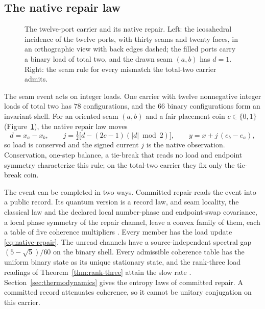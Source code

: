\documentclass[11pt]{article}
\theoremstyle{definition}
\theoremstyle{remark}
\begin{document}
\subsection{The native repair law}
\label{sec:native-repair}

\begin{figure}[!htb]
\centering

\caption{The twelve-port carrier and its native repair. Left: the icosahedral incidence of the twelve ports, with thirty seams and twenty faces, in an orthographic view with back edges dashed; the filled ports carry a binary load of total two, and the drawn seam $(a,b)$ has $d=1$. Right: the seam rule for every mismatch the total-two carrier admits.}
\label{fig:carrier}
\end{figure}

The seam event acts on integer loads. One carrier with twelve nonnegative
integer loads of total two has $78$ configurations, and the $66$ binary
configurations form an invariant shell. For an oriented seam $(a,b)$ and a
fair placement coin $c\in\{0,1\}$ (Figure~\ref{fig:carrier}), the native repair law moves
\begin{equation}
d=x_a-x_b,\qquad
j=\tfrac12\bigl[d-(2c-1)(|d|\bmod 2)\bigr],\qquad
y=x+j\,(e_b-e_a),
\label{eq:native-repair}
\end{equation}
so load is conserved and the signed current $j$ is the native observation.
Conservation, one-step balance, a tie-break that reads no load and endpoint
symmetry characterize this rule; on the total-two carrier they fix only the
tie-break coin.

The event can be completed in two ways. Committed repair reads the event
into a public record. Its quantum version is a record law, and seam
locality, the classical law and the declared local number-phase and
endpoint-swap covariance, a local phase symmetry of the repair channel, leave a convex
family of them, each a table of five coherence multipliers
\cite{ophrecordlaws}. Every member has the load update
\eqref{eq:native-repair}. The unread channels have a source-independent
spectral gap $(5-\sqrt5)/60$ on the binary shell. Every admissible coherence
table has the uniform binary state as its unique stationary state, and the
rank-three load readings of Theorem~\ref{thm:rank-three} attain the slow
rate \cite{ophrecordlaws,ophmixing}. Section~\ref{sec:thermodynamics} gives
the entropy laws of committed repair. A committed record attenuates
coherence, so it cannot be unitary conjugation on this carrier.
\end{document}
